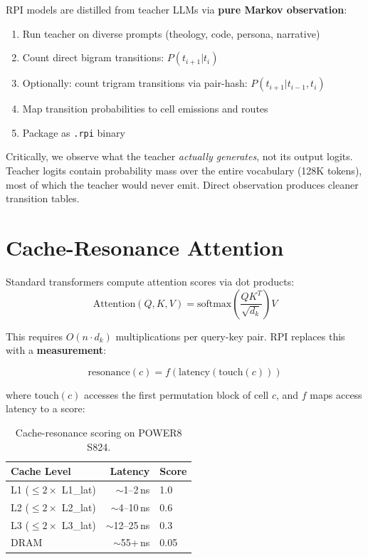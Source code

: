\documentclass[10pt,twocolumn]{article}
\begin{document}
RPI models are distilled from teacher LLMs via \textbf{pure Markov observation}:

\begin{enumerate}
\item Run teacher on diverse prompts (theology, code, persona, narrative)
\item Count direct bigram transitions: $P(t_{i+1} | t_i)$
\item Optionally: count trigram transitions via pair-hash: $P(t_{i+1} | t_{i-1}, t_i)$
\item Map transition probabilities to cell emissions and routes
\item Package as \texttt{.rpi} binary
\end{enumerate}

Critically, we observe what the teacher \emph{actually generates}, not its output logits. Teacher logits contain probability mass over the entire vocabulary (128K tokens), most of which the teacher would never emit. Direct observation produces cleaner transition tables.

\section{Cache-Resonance Attention}
\label{sec:cache}

Standard transformers compute attention scores via dot products:
\begin{equation}
\text{Attention}(Q, K, V) = \text{softmax}\left(\frac{QK^T}{\sqrt{d_k}}\right) V
\end{equation}

This requires $O(n \cdot d_k)$ multiplications per query-key pair. RPI replaces this with a \textbf{measurement}:

\begin{equation}
\text{resonance}(c) = f(\text{latency}(\text{touch}(c)))
\end{equation}

where $\text{touch}(c)$ accesses the first permutation block of cell $c$, and $f$ maps access latency to a score:

\begin{table}[h]
\centering
\small
\begin{tabular}{lrl}
\toprule
\textbf{Cache Level} & \textbf{Latency} & \textbf{Score} \\
\midrule
L1 ($\leq 2\times$ L1\_lat) & $\sim$1--2\,ns & 1.0 \\
L2 ($\leq 2\times$ L2\_lat) & $\sim$4--10\,ns & 0.6 \\
L3 ($\leq 2\times$ L3\_lat) & $\sim$12--25\,ns & 0.3 \\
DRAM & $\sim$55+\,ns & 0.05 \\
\bottomrule
\end{tabular}
\caption{Cache-resonance scoring on POWER8 S824.}
\label{tab:resonance}
\end{table}
\end{document}
